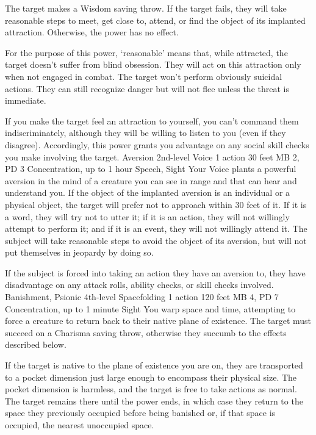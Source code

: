 The target makes a Wisdom saving throw. If the target fails,
they will take reasonable steps to meet, get close to, attend,
or find the object of its implanted attraction. Otherwise,
the power has no effect.

For the purpose of this power, `reasonable' means that, while
attracted, the target doesn't suffer from blind obsession.
They will act on this attraction only when not engaged in
combat. The target won't perform obviously suicidal actions.
They can still recognize danger but will not flee unless the
threat is immediate.

If you make the target feel an attraction to yourself, you
can't command them indiscriminately, although they will be
willing to listen to you (even if they disagree). Accordingly,
this power grants you advantage on any social skill checks
you make involving the target.
\DndPowerHeader%
    {Aversion\label{pwr:aversion}}
    {2nd-level Voice}
    {1 action}
    {30 feet}
    {MB 2, PD 3}
    {Concentration, up to 1 hour}
    {Speech, Sight}
Your Voice plants a powerful aversion in
the mind of a creature you can see in range
and that can hear and understand you. If the object
of the implanted aversion is an individual or a physical object,
the target will prefer not to approach within 30 feet of it.
If it is a word, they will try not to utter it; if it is an
action, they will not willingly attempt to perform it; and
if it is an event, they will not willingly attend it. The
subject will take reasonable steps to avoid the object of
its aversion, but will not put themselves in jeopardy by doing
so.

If the subject is forced into taking an action they have an
aversion to, they have disadvantage on any attack rolls, ability
checks, or skill checks involved.
\DndPowerHeader%
    {Banishment, Psionic\label{pwr:banishment_psionic}}
    {4th-level Spacefolding}
    {1 action}
    {120 feet}
    {MB 4, PD 7}
    {Concentration, up to 1 minute}
    {Sight}
You warp space and time,
attempting to force a creature to return back to their
native plane of existence.
The target must succeed on a Charisma saving throw,
otherwise they succumb to the effects described below.

If the target is native to the plane of existence you are on,
they are transported to a pocket dimension just large enough
to encompass their physical size.
The pocket dimension is harmless,
and the target is free to take actions as normal.
The target remains there until the power ends,
in which case they return to the space they previously occupied
before being banished or, if that space is occupied,
the nearest unoccupied space.

